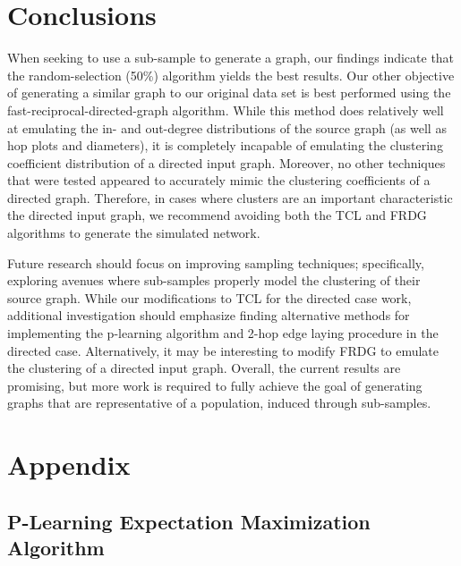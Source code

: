 \documentclass[pdftex,11pt,a4paper,twocolumn]{scrartcl}
\begin{document}
\section{Conclusions}
When seeking to use a sub-sample to generate a graph, our findings indicate that the random-selection (50\%) algorithm yields the best results. Our other objective of generating a similar graph to our original data set is best performed using the fast-reciprocal-directed-graph algorithm. While this method does relatively well at emulating the in- and out-degree distributions of the source graph (as well as hop plots and diameters), it is completely incapable of emulating the clustering coefficient distribution of a directed input graph. Moreover, no other techniques that were tested appeared to accurately mimic the clustering coefficients of a directed graph. Therefore, in cases where clusters are an important characteristic the directed input graph, we recommend avoiding both the TCL and FRDG algorithms to generate the simulated network. 

Future research should focus on improving sampling techniques; specifically, exploring avenues where sub-samples properly model the clustering of their source graph. While our modifications to TCL for the directed case work, additional investigation should emphasize finding alternative methods for implementing the p-learning algorithm and 2-hop edge laying procedure in the directed case. Alternatively, it may be interesting to modify FRDG to emulate the clustering of a directed input graph. Overall, the current results are promising, but more work is required to fully achieve the goal of generating graphs that are representative of a population, induced through sub-samples. 




\pagebreak
\onecolumn
\section{Appendix}
\subsection{P-Learning Expectation Maximization Algorithm}
\label{sec:pLearn}
\end{document}
